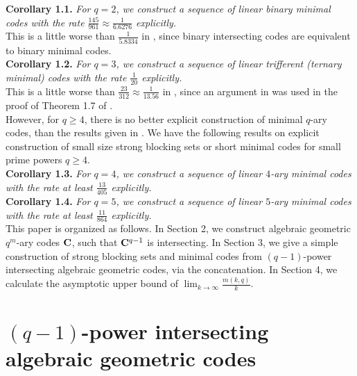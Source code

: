 \documentclass[10pt,a4paper]{article}
\begin{document}
{\bf Corollary 1.1.} {\em For $q=2$, we construct a sequence of linear binary minimal codes with the rate $\frac{145}{961} \approx \frac{1}{6.6276}$ explicitly.}\\

This is a little worse than $\frac{1}{5.8334}$ in \cite[Table 3]{Borello}, since binary intersecting codes are equivalent to binary minimal codes.\\



{\bf Corollary 1.2.} {\em For $q=3$, we construct a sequence of linear trifferent (ternary minimal) codes with the rate $\frac{1}{20}$ explicitly.}\\

This is a little worse than $\frac{23}{312}\approx \frac{1}{13.56}$ in \cite[Theorem 1.7]{Bishnoi}, since an argument in \cite{Alon1} was used in the proof of Theorem 1.7 of \cite{Bishnoi}.\\

However, for $q \geq 4$, there is no better explicit construction of minimal $q$-ary codes, than the results given in \cite[Table 3]{Alon}. We have the following results on explicit construction of small size strong blocking sets or short minimal codes for small prime powers $q \geq 4$.\\

{\bf Corollary 1.3.} {\em For $q=4$, we construct a sequence of linear $4$-ary minimal codes with the rate at least $\frac{13}{405}$ explicitly.}\\

{\bf Corollary 1.4.} {\em For $q=5$, we construct a sequence of linear $5$-ary minimal codes with the rate at least $\frac{11}{864}$ explicitly.}\\



This paper is organized as follows. In Section 2, we construct algebraic geometric $q^m$-ary codes ${\bf C}$, such that ${\bf C}^{q-1}$ is intersecting.  In Section 3, we give a simple construction of strong blocking sets and minimal codes from $(q-1)$-power intersecting algebraic geometric codes, via the concatenation. In Section 4, we calculate the asymptotic upper bound of $\lim_{k \longrightarrow \infty}\frac{m(k,q)}{k}$. \\

\section{$(q-1)$-power intersecting algebraic geometric codes}
\end{document}
